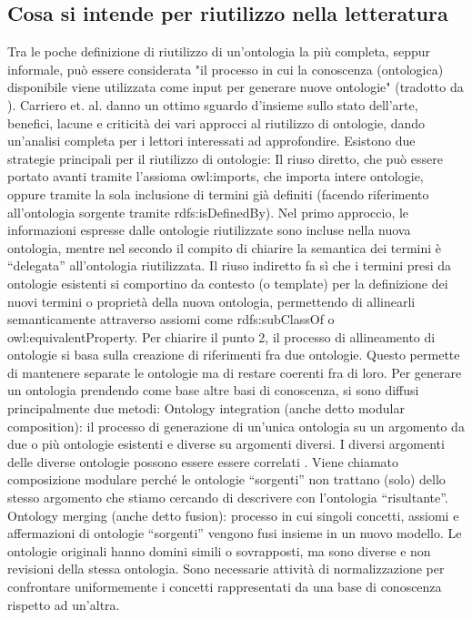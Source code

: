 \subsection{Cosa si intende per riutilizzo nella letteratura}
Tra le poche definizione di riutilizzo di un'ontologia la più completa, seppur informale, può essere considerata "il processo in cui la conoscenza (ontologica) disponibile viene utilizzata come input per generare nuove ontologie" (tradotto da \cite{...}). Carriero et. al. \cite{...} danno un ottimo sguardo d'insieme sullo stato dell'arte, benefici, lacune e criticità dei vari approcci al riutilizzo di ontologie, dando un'analisi completa per i lettori interessati ad approfondire.
Esistono due strategie principali per il riutilizzo di ontologie: 
Il riuso diretto, che può essere portato avanti tramite l'assioma owl:imports, che importa intere ontologie, oppure tramite la sola inclusione di termini già definiti (facendo riferimento all'ontologia sorgente tramite rdfs:isDefinedBy). Nel primo approccio, le informazioni espresse dalle ontologie riutilizzate sono incluse nella nuova ontologia, mentre nel secondo il compito di chiarire la semantica dei termini è “delegata” all'ontologia riutilizzata.
Il riuso indiretto fa sì che i termini presi da ontologie esistenti si comportino da contesto (o template) per la definizione dei nuovi termini o proprietà della nuova ontologia, permettendo di allinearli semanticamente attraverso assiomi come rdfs:subClassOf o owl:equivalentProperty.
Per chiarire il punto 2, il processo di allineamento di ontologie si basa sulla creazione di riferimenti fra due ontologie. Questo permette di mantenere separate le ontologie ma di restare coerenti fra di loro. \cite{...}
Per generare un ontologia prendendo come base altre basi di conoscenza, si sono diffusi principalmente due metodi:
Ontology integration (anche detto modular composition): il processo di generazione di un'unica ontologia su un argomento da due o più ontologie esistenti e diverse su argomenti diversi. I diversi argomenti delle diverse ontologie possono essere essere correlati \cite{...}. Viene chiamato composizione modulare perché le ontologie “sorgenti” non trattano (solo) dello stesso argomento che stiamo cercando di descrivere con l'ontologia “risultante”.
Ontology merging (anche detto fusion): processo in cui singoli concetti, assiomi e affermazioni di ontologie “sorgenti” vengono fusi insieme in un nuovo modello. Le ontologie originali hanno domini simili o sovrapposti, ma sono diverse e non revisioni della stessa ontologia. Sono necessarie attività di normalizzazione per confrontare uniformemente i concetti rappresentati da una base di conoscenza rispetto ad un'altra. \cite{.., ..}
